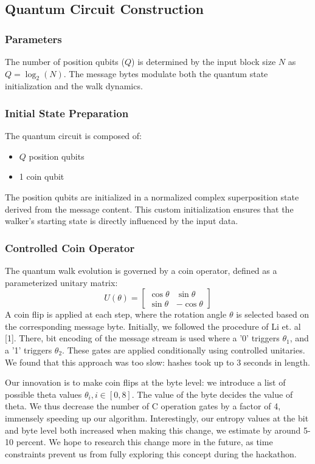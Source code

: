 \documentclass[conference]{IEEEtran}
\begin{document}
\subsection{Quantum Circuit Construction}

\subsubsection{Parameters}
The number of position qubits ($Q$) is determined by the input block size $N$ as $Q = \log_2(N)$. The message bytes modulate both the quantum state initialization and the walk dynamics.

\subsubsection{Initial State Preparation}
The quantum circuit is composed of:
\begin{itemize}
    \item $Q$ position qubits
    \item 1 coin qubit
\end{itemize}
The position qubits are initialized in a normalized complex superposition state derived from the message content. This custom initialization ensures that the walker’s starting state is directly influenced by the input data.

\subsubsection{Controlled Coin Operator}
The quantum walk evolution is governed by a coin operator, defined as a parameterized unitary matrix:
\[
U(\theta) = \begin{bmatrix}
\cos \theta & \sin \theta \\
\sin \theta & -\cos \theta
\end{bmatrix}
\]
A coin flip is applied at each step, where the rotation angle $\theta$ is selected based on the corresponding message byte. Initially, we followed the procedure of Li et. al [1]. There, bit encoding of the message stream is used where a '0' triggers $\theta_1$, and a '1' triggers $\theta_2$. These gates are applied conditionally using controlled unitaries. We found that this approach was too slow: hashes took up to 3 seconds in length. 

Our innovation is to make coin flips at the byte level: we introduce a list of possible theta values $\theta_i, i\in [0,8]$. The value of the byte decides the value of theta. We thus decrease the number of C operation gates by a factor of 4, immensely speeding up our algorithm. Interestingly, our entropy values at the bit and byte level both increased when making this change, we estimate by around 5-10 percent. We hope to research this change more in the future, as time constraints prevent us from fully exploring this concept during the hackathon.
\end{document}
